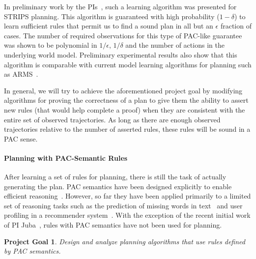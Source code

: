 \documentclass[12pt]{article}
\newtheorem{problem}{Project Goal}
\begin{document}
In preliminary work by the PIs~\cite{stern2017efficientAndSafe}, such a learning algorithm was presented for STRIPS planning. This algorithm is guaranteed with high probability ($1-\delta$)  to learn sufficient rules that permit us to find a sound plan in all but an $\epsilon$ fraction of cases. The number of required observations for this type of PAC-like guarantee was shown to be polynomial in $1/\epsilon$, $1/\delta$ and the number of actions in the underlying world model. Preliminary experimental results also show that this algorithm is comparable with current model learning algorithms for planning such as ARMS~\cite{yang2007learning}. 


In general, we will try to achieve the aforementioned project goal by modifying algorithms for proving the correctness of a plan to give them the ability to assert new rules (that would help complete a proof) when they are consistent with the entire set of observed trajectories. As long as there are enough observed trajectories relative to the number of asserted rules, these rules will be sound in a PAC sense. 




\paragraph{Planning with PAC-Semantic Rules}


After learning a set of rules for planning, there is still the task of actually generating the plan. PAC semantics have been designed explicitly to enable efficient reasoning~\cite{valiant2000robustLogics}. However, so far they have been applied primarily to a limited set of reasoning tasks such as the prediction of missing words in text~\cite{michael2008first} and user profiling in a recommender system~\cite{semeraro2009knowledge}. With the exception of the recent initial work of PI Juba~\cite{juba2016jmlr}, rules with PAC semantics have not been used for planning. %
\begin{problem}
Design and analyze planning algorithms that use rules defined by PAC semantics.
\end{problem}

\end{document}
